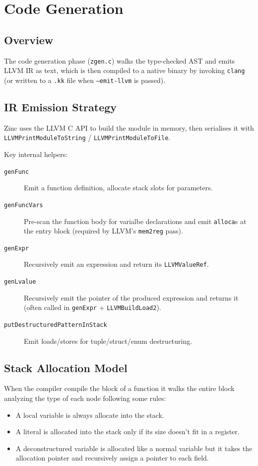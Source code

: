 \chapter{Code Generation}
\label{ch:codegen}

\section{Overview}

The code generation phase (\texttt{zgen.c}) walks the type-checked AST and emits LLVM IR as text, which is then compiled to a native binary by invoking \texttt{clang} (or written to a \texttt{.kk} file when \texttt{--emit-llvm} is passed).

\section{IR Emission Strategy}
Zinc uses the LLVM C API to build the module in memory, then serialises it with \texttt{LLVMPrintModuleToString} / \texttt{LLVMPrintModuleToFile}.

Key internal helpers:
\begin{description}
    \item[\texttt{genFunc}] Emit a function definition, allocate stack slots for parameters.
    \item[\texttt{genFuncVars}] Pre-scan the function body for varialbe declarations and emit \texttt{alloca}s at the entry block (required by LLVM's \texttt{mem2reg} pass).
    \item[\texttt{genExpr}] Recursively emit an expression and return its \texttt{LLVMValueRef}.
    \item[\texttt{genLvalue}] Recursively emit the pointer of the produced expression and returns it (often called in \texttt{genExpr} + \texttt{LLVMBuildLoad2}).
    \item[\texttt{putDestructuredPatternInStack}] Emit loads/stores for tuple/struct/enum destructuring.
\end{description}

\section{Stack Allocation Model}
When the compiler compile the block of a function it walks the entire block analyzing the type of each node following some rules:
\begin{itemize}
    \item A local variable is always allocate into the stack.
    \item A literal is allocated into the stack only if its size doesn't fit in a register.
    \item A deconstructured variable is allocated like a normal variable but it takes the allocation pointer and recursively assign a pointer to each field.
\end{itemize}

